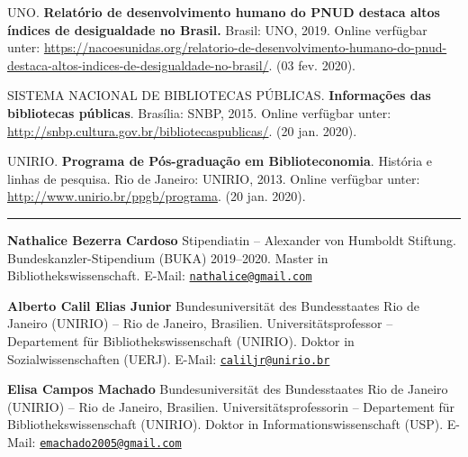 \documentclass[a4paper,
fontsize=11pt,
oneside,
numbers=noperiodatend,
parskip=half-,
bibliography=totoc,
final
]{scrartcl}
\begin{document}
UNO. \textbf{Relatório de desenvolvimento humano do PNUD destaca altos
índices de desigualdade no Brasil.} Brasil: UNO, 2019. Online verfügbar
unter:
\url{https://nacoesunidas.org/relatorio-de-desenvolvimento-humano-do-pnud-destaca-altos-indices-de-desigualdade-no-brasil/}.
(03 fev. 2020).

SISTEMA NACIONAL DE BIBLIOTECAS PÚBLICAS. \textbf{Informações das
bibliotecas públicas}. Brasília: SNBP, 2015. Online verfügbar unter:
\url{http://snbp.cultura.gov.br/bibliotecaspublicas/}. (20 jan. 2020).

UNIRIO. \textbf{Programa de Pós-graduação em Biblioteconomia}. História
e linhas de pesquisa. Rio de Janeiro: UNIRIO, 2013. Online verfügbar
unter: \url{http://www.unirio.br/ppgb/programa}. (20 jan. 2020).

\begin{center}\rule{0.5\linewidth}{0.5pt}\end{center}

\textbf{Nathalice Bezerra Cardoso} Stipendiatin -- Alexander von
Humboldt Stiftung. Bundeskanzler-Stipendium (BUKA) 2019--2020. Master in
Bibliothekswissenschaft. E-Mail:
\href{mailto:nathalice@gmail.com}{\nolinkurl{nathalice@gmail.com}}

\textbf{Alberto Calil Elias Junior} Bundesuniversität des Bundesstaates
Rio de Janeiro (UNIRIO) -- Rio de Janeiro, Brasilien.
Universitätsprofessor -- Departement für Bibliothekswissenschaft
(UNIRIO). Doktor in Sozialwissenschaften (UERJ). E-Mail:
\href{mailto:caliljr@unirio.br}{\nolinkurl{caliljr@unirio.br}}

\textbf{Elisa Campos Machado} Bundesuniversität des Bundesstaates Rio de
Janeiro (UNIRIO) -- Rio de Janeiro, Brasilien. Universitätsprofessorin
-- Departement für Bibliothekswissenschaft (UNIRIO). Doktor in
Informationswissenschaft (USP). E-Mail:
\href{mailto:emachado2005@gmail.com}{\nolinkurl{emachado2005@gmail.com}}
\end{document}
